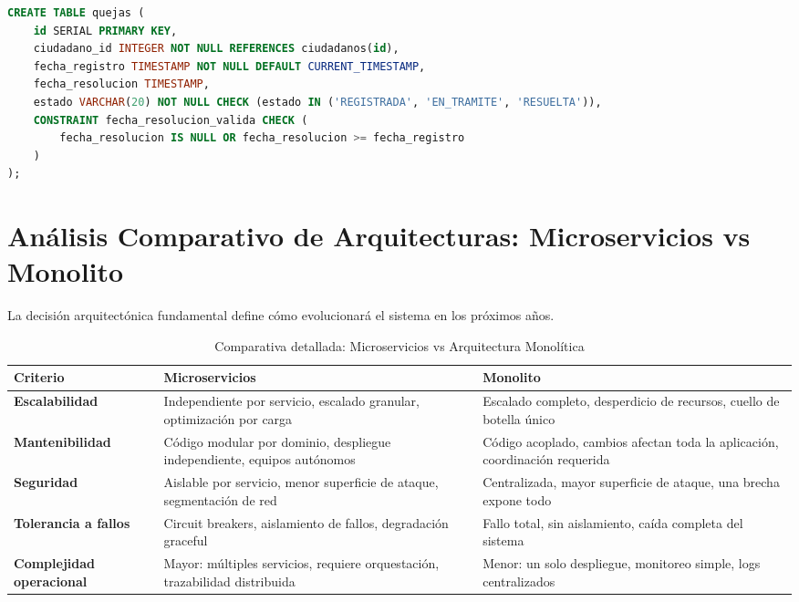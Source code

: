 \begin{lstlisting}[language=SQL, caption=Constraints de integridad en PostgreSQL]
CREATE TABLE quejas (
    id SERIAL PRIMARY KEY,
    ciudadano_id INTEGER NOT NULL REFERENCES ciudadanos(id),
    fecha_registro TIMESTAMP NOT NULL DEFAULT CURRENT_TIMESTAMP,
    fecha_resolucion TIMESTAMP,
    estado VARCHAR(20) NOT NULL CHECK (estado IN ('REGISTRADA', 'EN_TRAMITE', 'RESUELTA')),
    CONSTRAINT fecha_resolucion_valida CHECK (
        fecha_resolucion IS NULL OR fecha_resolucion >= fecha_registro
    )
);
\end{lstlisting}

\section{Análisis Comparativo de Arquitecturas: Microservicios vs Monolito}

La decisión arquitectónica fundamental define cómo evolucionará el sistema en los próximos años.

\begin{table}[htbp]
\centering
\caption{Comparativa detallada: Microservicios vs Arquitectura Monolítica}
\label{tab:comparativa-arquitectura}
\small
\begin{tabular}{|p{2.8cm}|p{4.2cm}|p{4.2cm}|}
\hline
\textbf{Criterio} & \textbf{Microservicios} & \textbf{Monolito} \\
\hline
\textbf{Escalabilidad} & Independiente por servicio, escalado granular, optimización por carga & Escalado completo, desperdicio de recursos, cuello de botella único \\
\hline
\textbf{Mantenibilidad} & Código modular por dominio, despliegue independiente, equipos autónomos & Código acoplado, cambios afectan toda la aplicación, coordinación requerida \\
\hline
\textbf{Seguridad} & Aislable por servicio, menor superficie de ataque, segmentación de red & Centralizada, mayor superficie de ataque, una brecha expone todo \\
\hline
\textbf{Tolerancia a fallos} & Circuit breakers, aislamiento de fallos, degradación graceful & Fallo total, sin aislamiento, caída completa del sistema \\
\hline
\textbf{Complejidad operacional} & Mayor: múltiples servicios, requiere orquestación, trazabilidad distribuida & Menor: un solo despliegue, monitoreo simple, logs centralizados \\
\hline
\end{tabular}
\end{table}

